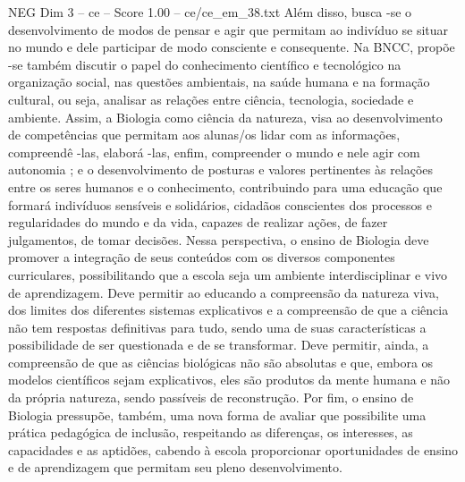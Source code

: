 \begin{textsample}{NEG Dim 3 – ce – Score 1.00 – ce/ce\_em\_38.txt}
Além disso, busca -se o desenvolvimento de modos de pensar e agir que permitam ao indivíduo se situar no mundo e dele participar de modo consciente e consequente.
Na BNCC, propõe -se também discutir o papel do conhecimento científico e tecnológico na organização social, nas questões ambientais, na saúde humana e na formação cultural, ou seja, analisar as relações entre ciência, tecnologia, sociedade e ambiente.
Assim, a Biologia como ciência da natureza, visa ao desenvolvimento de competências que permitam aos alunas/os lidar com as informações, compreendê -las, elaborá -las, enfim, compreender o mundo e nele agir com autonomia ; e o desenvolvimento de posturas e valores pertinentes às relações entre os seres humanos e o conhecimento, contribuindo para uma educação que formará indivíduos sensíveis e solidários, cidadãos conscientes dos processos e regularidades do mundo e da vida, capazes de realizar ações, de fazer julgamentos, de tomar decisões.
Nessa perspectiva, o ensino de Biologia deve promover a integração de seus conteúdos com os diversos componentes curriculares, possibilitando que a escola seja um ambiente interdisciplinar e vivo de aprendizagem.
Deve permitir ao educando a compreensão da natureza viva, dos limites dos diferentes sistemas explicativos e a compreensão de que a ciência não tem respostas definitivas para tudo, sendo uma de suas características a possibilidade de ser questionada e de se transformar.
Deve permitir, ainda, a compreensão de que as ciências biológicas não são absolutas e que, embora os modelos científicos sejam explicativos, eles são produtos da mente humana e não da própria natureza, sendo passíveis de reconstrução.
Por fim, o ensino de Biologia pressupõe, também, uma nova forma de avaliar que possibilite uma prática pedagógica de inclusão, respeitando as diferenças, os interesses, as capacidades e as aptidões, cabendo à escola proporcionar oportunidades de ensino e de aprendizagem que permitam seu pleno desenvolvimento.

\end{textsample}
